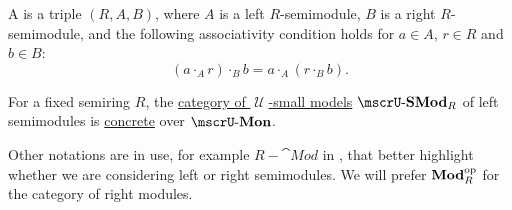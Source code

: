 \begin{definition}
\begin{thmenum}[resume=def:semimodule]
     A  is a triple \( (R, A, B) \), where \( A \) is a left \( R \)-semimodule, \( B \) is a right \( R \)-semimodule, and the following associativity condition holds for \( a \in A \), \( r \in R \) and \( b \in B \):
    \begin{equation}\label{eq:def:semimodule/bimodule/associativity}
      (a \cdot_A r) \cdot_B b = a \cdot_A (r \cdot_B b).
    \end{equation}

     For a fixed semiring \( R \), the \hyperref[def:category_of_small_first_order_models]{category of \( \mscrU \)-small models} \( \ucat{SMod}_R \) of left semimodules is \hyperref[def:concrete_category]{concrete} over \hyperref[def:monoid]{\( \ucat{Mon} \)}.

    Other notations are in use, for example \( R-\cat{Mod} \) in \cite[158]{Aluffi2009}, that better highlight whether we are considering left or right semimodules. We will prefer \( \operatorname{\mathbf{Mod}}_R^{\operatorname{op}} \) for the category of right modules.
  \end{thmenum}
\end{definition}
